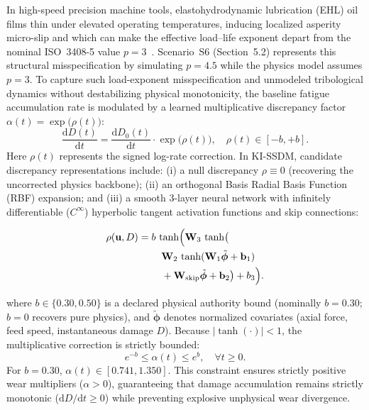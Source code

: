 \documentclass[a4paper,fleqn]{cas-dc}
\begin{document}
In high-speed precision machine tools, elastohydrodynamic lubrication (EHL) oil films thin under elevated operating temperatures, inducing localized asperity micro-slip and which can make the effective load--life exponent depart from the nominal ISO~3408-5 value $p = 3$~\cite{ISO_3408_5}. Scenario~S6 (Section~5.2) represents this structural misspecification by simulating $p = 4.5$ while the physics model assumes $p = 3$. To capture such load-exponent misspecification and unmodeled tribological dynamics without destabilizing physical monotonicity, the baseline fatigue accumulation rate is modulated by a learned multiplicative discrepancy factor $\alpha(t) = \exp\bigl(\rho(t)\bigr)$:
\begin{equation}
    \frac{\mathrm{d}D(t)}{\mathrm{d}t} = \frac{\mathrm{d}D_0(t)}{\mathrm{d}t} \cdot \exp\bigl(\rho(t)\bigr), \quad \rho(t) \in [-b, +b].
    \label{eq:total_rate}
\end{equation}
Here $\rho(t)$ represents the signed log-rate correction. In KI-SSDM, candidate discrepancy representations include:
(i) a null discrepancy $\rho \equiv 0$ (recovering the uncorrected physics backbone);
(ii) an orthogonal Basis Radial Basis Function (RBF) expansion; and
(iii) a smooth 3-layer neural network with infinitely differentiable ($C^\infty$) hyperbolic tangent activation functions and skip connections:

\begin{equation}
\label{eq:tanh_discrepancy}
\begin{aligned}
\rho(\mathbf{u},D)
={}& b\,\tanh\Bigl(
\mathbf{W}_3\,\tanh\bigl(\\
&\quad \mathbf{W}_2\,\tanh(
\mathbf{W}_1\tilde{\boldsymbol{\phi}}
+\mathbf{b}_1)\\
&\quad +\mathbf{W}_{\mathrm{skip}}
\tilde{\boldsymbol{\phi}}
+\mathbf{b}_2
\bigr)+b_3\Bigr).
\end{aligned}
\end{equation}

where $b \in \{0.30, 0.50\}$ is a declared physical authority bound (nominally $b=0.30$; $b = 0$ recovers pure physics), and $\tilde{\boldsymbol{\phi}}$ denotes normalized covariates (axial force, feed speed, instantaneous damage $D$). Because $|\tanh(\cdot)| < 1$, the multiplicative correction is strictly bounded:
\begin{equation}
    e^{-b} \le \alpha(t) \le e^b, \quad \forall t \ge 0.
    \label{eq:authority_bound}
\end{equation}
For $b = 0.30$, $\alpha(t) \in [0.741, 1.350]$. This constraint ensures strictly positive wear multipliers ($\alpha > 0$), guaranteeing that damage accumulation remains strictly monotonic ($\mathrm{d}D / \mathrm{d}t \ge 0$) while preventing explosive unphysical wear divergence.
\end{document}
